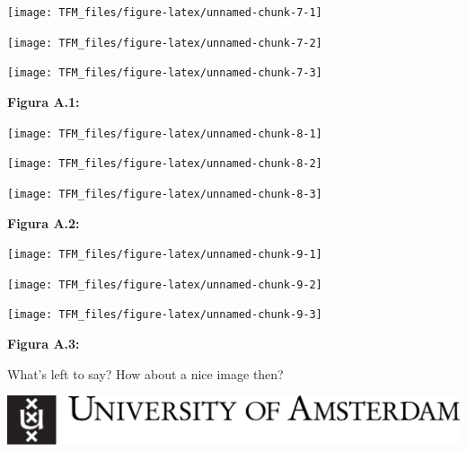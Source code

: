 \documentclass[11pt,spanish,a4paper,oneside,]{book} %
\begin{document}
\begin{center}\texttt{[image: TFM\_files/figure-latex/unnamed-chunk-7-1]} \end{center}

\begin{center}\texttt{[image: TFM\_files/figure-latex/unnamed-chunk-7-2]} \end{center}

\begin{center}\texttt{[image: TFM\_files/figure-latex/unnamed-chunk-7-3]} \end{center}

\begin{center}
\textbf{Figura A.1:}

\end{center}

\begin{center}\texttt{[image: TFM\_files/figure-latex/unnamed-chunk-8-1]} \end{center}

\begin{center}\texttt{[image: TFM\_files/figure-latex/unnamed-chunk-8-2]} \end{center}

\begin{center}\texttt{[image: TFM\_files/figure-latex/unnamed-chunk-8-3]} \end{center}

\begin{center}
\textbf{Figura A.2:}

\end{center}

\begin{center}\texttt{[image: TFM\_files/figure-latex/unnamed-chunk-9-1]} \end{center}

\begin{center}\texttt{[image: TFM\_files/figure-latex/unnamed-chunk-9-2]} \end{center}

\begin{center}\texttt{[image: TFM\_files/figure-latex/unnamed-chunk-9-3]} \end{center}

\begin{center}
\textbf{Figura A.3:}

\end{center}

What's left to say? How about a nice image then?

\includegraphics{figures/uvalogo_regular_p_en.pdf}
\end{document}
